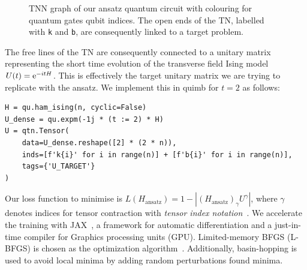 \begin{figure}[ht]
    \centering
     \quad
    
    \caption{TNN graph of our ansatz quantum circuit with colouring for \protect{} quantum gates \protect{} qubit indices. The open ends of the TN, labelled with \texttt{k} and \texttt{b}, are consequently linked to a target problem.}
    \label{fig:TNN_circuit}
\end{figure}
The free lines of the TN are consequently connected to a unitary matrix representing the short time evolution of the transverse field Ising model $U(t) = \mathrm{e}^{-itH}$.
This is effectively the target unitary matrix we are trying to replicate with the ansatz.
We implement this in quimb for $t=2$ as follows:
\begin{verbatim}
H = qu.ham_ising(n, cyclic=False)
U_dense = qu.expm(-1j * (t := 2) * H)
U = qtn.Tensor(
    data=U_dense.reshape([2] * (2 * n)),
    inds=[f'k{i}' for i in range(n)] + [f'b{i}' for i in range(n)],
    tags={'U_TARGET'}
)
\end{verbatim}

Our loss function to minimise is $L(H_\text{ansatz}) = 1 - \left|\left(H_\text{ansatz}\right)_\gamma U^\gamma \right|$, where $\gamma$ denotes indices for tensor contraction with \emph{tensor index notation}~\cite{Haghshenas2021}.
We accelerate the training with JAX~\cite{jax2018github}, a framework for automatic differentiation and a just-in-time compiler for Graphics processing units (GPU). Limited-memory BFGS (L-BFGS) is chosen as the optimization algorithm~\cite{zhu1997algorithm}. Additionally, basin-hopping is used to avoid local minima by adding random perturbations found minima.



